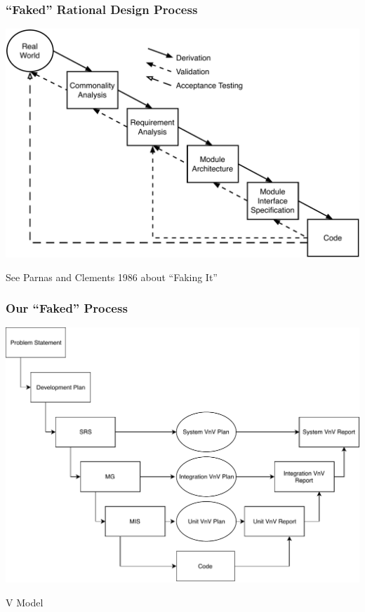 \documentclass[t,12pt,numbers,fleqn]{beamer}
\begin{document}

\begin{frame}

\frametitle{``Faked'' Rational Design Process}

\begin{center}
\includegraphics[scale=0.4]{../Figures/Waterfall.pdf}
\end{center}

See Parnas and Clements 1986 about ``Faking It''

\end{frame}


\begin{frame}

\frametitle{Our ``Faked'' Process}

\begin{center}
\includegraphics[scale=0.55]{../Figures/VModelOfProcess.pdf}
\end{center}
\vspace{-1.0cm}
V Model

\end{frame}
\end{document}
